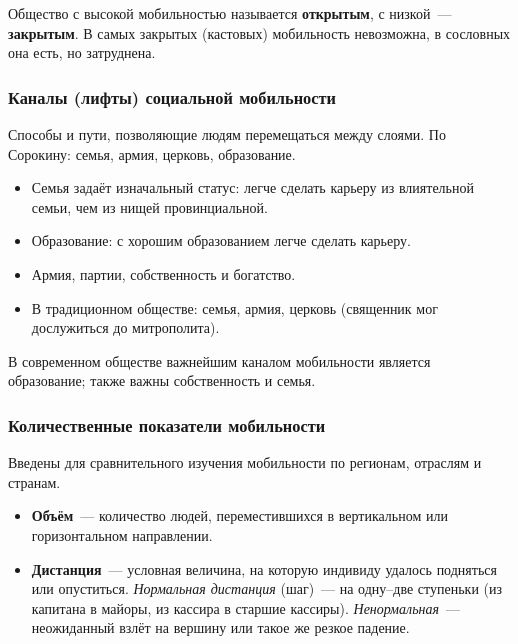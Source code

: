 \documentclass[12pt]{article}
\begin{document}
	\begin{definition}
		Общество с высокой мобильностью называется \textbf{открытым}, с низкой~--- \textbf{закрытым}. В самых закрытых (кастовых) мобильность невозможна, в сословных она есть, но затруднена.
	\end{definition}

	\subsubsection{Каналы (лифты) социальной мобильности}

	Способы и пути, позволяющие людям перемещаться между слоями. По Сорокину: семья, армия, церковь, образование.

	\begin{itemize}
		\item Семья задаёт изначальный статус: легче сделать карьеру из влиятельной семьи, чем из нищей провинциальной.
		\item Образование: с хорошим образованием легче сделать карьеру.
		\item Армия, партии, собственность и богатство.
		\item В традиционном обществе: семья, армия, церковь (священник мог дослужиться до митрополита).
	\end{itemize}

	\begin{note}
		В современном обществе важнейшим каналом мобильности является образование; также важны собственность и семья.
	\end{note}

	\subsubsection{Количественные показатели мобильности}

	Введены для сравнительного изучения мобильности по регионам, отраслям и странам.

	\begin{itemize}
		\item \textbf{Объём}~--- количество людей, переместившихся в вертикальном или горизонтальном направлении.
		\item \textbf{Дистанция}~--- условная величина, на которую индивиду удалось подняться или опуститься. \textit{Нормальная дистанция} (шаг)~--- на одну--две ступеньки (из капитана в майоры, из кассира в старшие кассиры). \textit{Ненормальная}~--- неожиданный взлёт на вершину или такое же резкое падение.
	\end{itemize}
\end{document}
